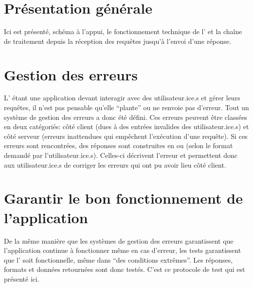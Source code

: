 \section{Présentation générale}
Ici est présenté, schéma à l'appui, le fonctionnement technique de l'\api{} et la chaîne de traitement depuis la réception des requêtes jusqu'à l'envoi d'une réponse.

\section{Gestion des erreurs}
L'\api{} étant une application devant interagir avec des utilisateur.ice.s et gérer leurs requêtes, il n'est pas pensable qu'elle \enquote{plante} ou ne renvoie pas d'erreur. Tout un système de gestion des erreurs a donc été défini. Ces erreurs peuvent être classées en deux catégoriés: côté client (dues à des entrées invalides des utilisateur.ice.s)  et côté serveur (erreurs inattendues qui empêchent l'exécution d'une requête). Si ces erreurs sont rencontrées, des réponses sont construites en \json{} ou \xmltei{} (selon le format demandé par l'utilisateur.ice.s). Celles-ci décrivent l'erreur et permettent donc aux utilisateur.ice.s de corriger les erreurs qui ont pu avoir lieu côté client.

\section{Garantir le bon fonctionnement de l'application}
De la même manière que les systèmes de gestion des erreurs garantissent que l'application continue à fonctionner même en cas d'erreur, les tests garantissent que l'\api{} soit fonctionnelle, même dans \enquote{des conditions extrêmes}. Les réponses, formats et données retournées sont donc testés. C'est ce protocole de test qui est présenté ici.